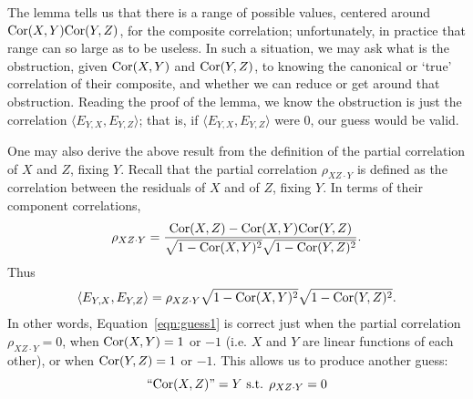 \documentclass[sigconf]{acmart}
\def\Cor{\textnormal{Cor}}
\begin{document}
The lemma tells us that there is a range of possible values, centered around $\Cor(X,Y)\Cor(Y,Z)$, for the composite correlation; unfortunately, in practice that range can so large as to be useless. In such a situation, we may ask what is the obstruction, given $\Cor(X,Y)$ and $\Cor(Y,Z)$, to knowing the canonical or `true' correlation of their composite, and whether we can reduce or get around that obstruction. Reading the proof of the lemma, we know the obstruction is just the correlation $\langle E_{Y,X}, E_{Y,Z} \rangle$; that is, if $\langle E_{Y,X}, E_{Y,Z} \rangle$ were 0, our guess would be valid.

One may also derive the above result from the definition of the partial correlation of $X$ and $Z$, fixing $Y$. Recall that the partial correlation $\rho_{XZ \cdot Y}$ is defined as the correlation between the residuals of $X$ and of $Z$, fixing $Y$. In terms of their component correlations,
\[ \rho_{XZ \cdot Y} = \frac{\Cor(X,Z) - \Cor(X,Y)\Cor(Y,Z)}{\sqrt{1-\Cor(X,Y)^2}\sqrt{1-\Cor(Y,Z)^2}}. \]
Thus 
\[\langle E_{Y,X}, E_{Y,Z} \rangle = \rho_{XZ \cdot Y} \sqrt{1-\Cor(X,Y)^2}\sqrt{1-\Cor(Y,Z)^2}.\] 
In other words, Equation~\ref{eqn:guess1} is correct just when the partial correlation $\rho_{XZ\cdot Y} = 0$, when $\Cor(X,Y) = 1$ or $-1$ (i.e. $X$ and $Y$ are linear functions of each other), or when $\Cor(Y,Z) = 1$ or $-1$. This allows us to produce another guess:
\begin{equation}\label{eqn:guess2}
\text{``}\Cor(X,Z)\text{''} = Y \text{ s.t. } \rho_{XZ \cdot Y} = 0
\end{equation}

\end{document}
